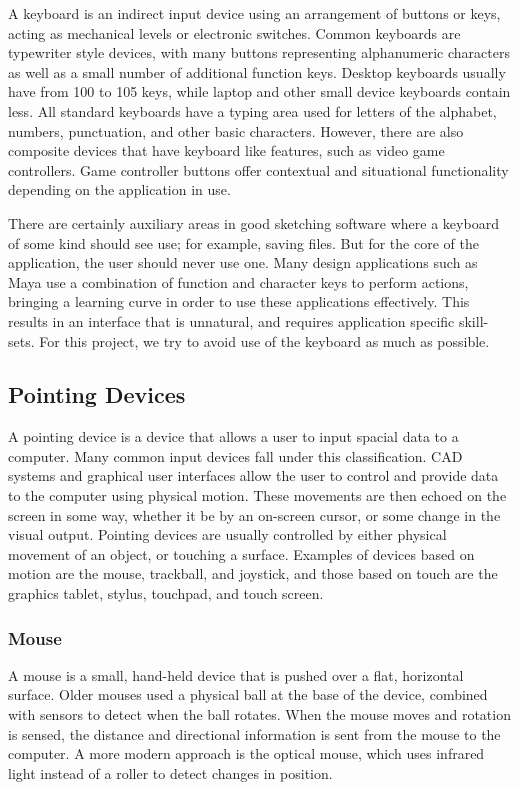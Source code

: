 \documentclass[11pt]{report}
\begin{document}
A keyboard is an indirect input device using an arrangement of buttons or keys, acting as mechanical levels or electronic switches. 
Common keyboards are typewriter style devices, with many buttons representing alphanumeric characters as well as a small number of additional function keys.
Desktop keyboards usually have from 100 to 105 keys, while laptop and other small device keyboards contain less.
All standard keyboards have a typing area used for letters of the alphabet, numbers, punctuation, and other basic characters.
However, there are also composite devices that have keyboard like features, such as video game controllers. 
Game controller buttons offer contextual and situational functionality depending on the application in use.


There are certainly auxiliary areas in good sketching software where a keyboard of some kind should see use; for example, saving files. 
But for the core of the application, the user should never use one. 
Many design applications such as Maya use a combination of function and character keys to perform actions, bringing a learning curve in order to use these applications effectively.
This results in an interface that is unnatural, and requires application specific skill-sets.
For this project, we try to avoid use of the keyboard as much as possible.


\subsection{Pointing Devices}
 A pointing device is a device that allows a user to input spacial data to a computer. 
 Many common input devices fall under this classification. 
 CAD systems and graphical user interfaces allow the user to control and provide data to the computer using physical motion.
 These movements are then echoed on the screen in some way, whether it be by an on-screen cursor, or some change in the visual output.
 Pointing devices are usually controlled by either physical movement of an object, or touching a surface.
 Examples of devices based on motion are the mouse, trackball, and joystick, and those based on touch are the graphics tablet, stylus, touchpad, and touch screen.
 
 \subsubsection{Mouse}
 A mouse is a small, hand-held device that is pushed over a flat, horizontal surface.
 Older mouses used a physical ball at the base of the device, combined with sensors to detect when the ball rotates.
 When the mouse moves and rotation is sensed, the distance and directional information is sent from the mouse to the computer.
 A more modern approach is the optical mouse, which uses infrared light instead of a roller to detect changes in position.
 
\end{document}
